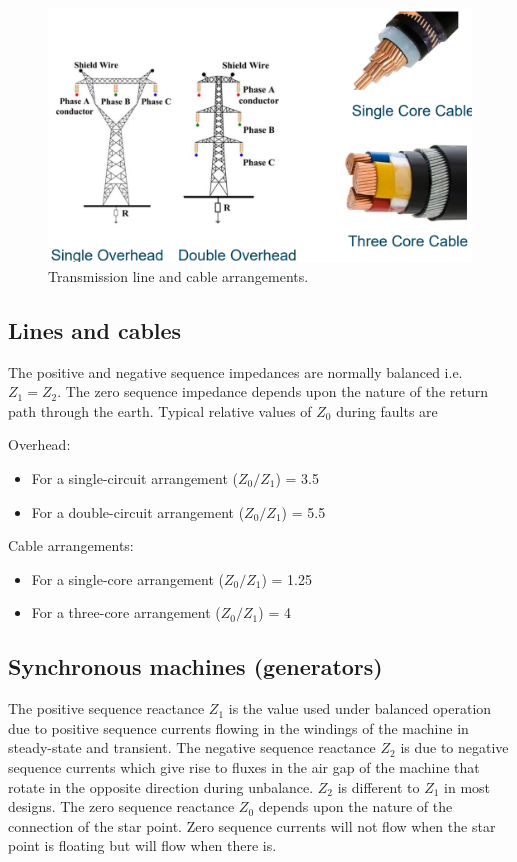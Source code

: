 \begin{figure}[H]
	\centering
	\includegraphics[width = \textwidth]{./img/figure33.png}
	\caption{Transmission line and cable arrangements.}
\end{figure}
\subsection{Lines and cables}
The positive and negative sequence impedances are normally balanced i.e. $Z_1 = Z_2$. The zero sequence impedance depends upon the nature of the return path through the earth. Typical relative values of $Z_0$ during faults are

Overhead:
\begin{itemize}
	\item For a single-circuit arrangement ($Z_0/Z_1$) = 3.5
	\item For a double-circuit arrangement ($Z_0/Z_1$) = 5.5
\end{itemize}
Cable arrangements:
\begin{itemize}
	\item For a single-core arrangement ($Z_0/Z_1$) = 1.25
	\item For a three-core arrangement ($Z_0/Z_1$) = 4
\end{itemize}
\subsection{Synchronous machines (generators)}
The positive sequence reactance $Z_1$ is the value used under balanced operation due to positive sequence currents flowing in the windings of the machine in steady-state and transient. The negative sequence reactance $Z_2$ is due to negative sequence currents which give rise to fluxes in the air gap of the machine that rotate in the opposite direction during unbalance. $Z_2$ is different to $Z_1$ in most designs. The zero sequence reactance $Z_0$ depends upon the nature of the connection of the star point. Zero sequence currents will not flow when the star point is floating but will flow when there is.
